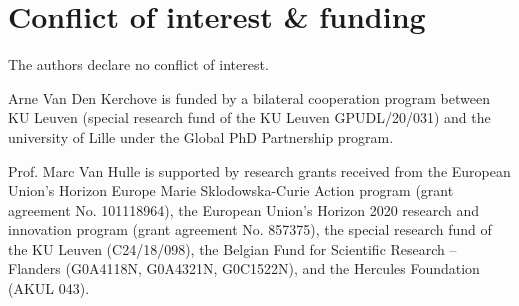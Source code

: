 \chapter*{Conflict of interest \& funding}
The authors declare no conflict of interest.

Arne Van Den Kerchove is funded by a bilateral cooperation program between KU
Leuven (special research fund of the KU Leuven GPUDL/20/031) and the university
of Lille under the Global PhD Partnership program.

Prof. Marc Van Hulle is supported by research grants received from
the European Union’s Horizon Europe Marie Sklodowska-Curie Action program
(grant agreement No. 101118964), the European Union’s Horizon 2020 research and
innovation program (grant agreement No. 857375), the special research fund of
the KU Leuven (C24/18/098), the Belgian Fund for Scientific Research – Flanders
(G0A4118N, G0A4321N, G0C1522N), and the Hercules
Foundation (AKUL 043).
